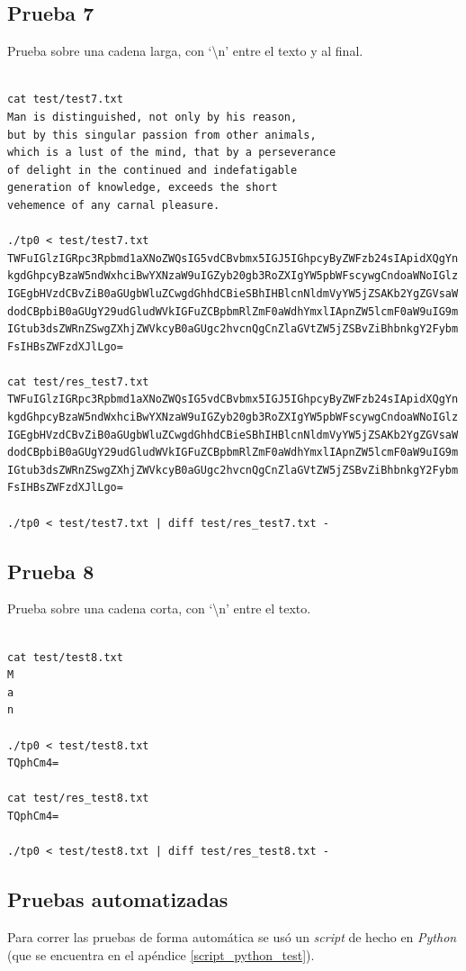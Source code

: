 \documentclass[titlepage,a4paper]{article}
\begin{document}
\subsection{Prueba 7}
Prueba sobre una cadena larga, con `\textbackslash n' entre el texto y al final.
\begin{lstlisting}[style=test_run_style]

cat test/test7.txt
Man is distinguished, not only by his reason, 
but by this singular passion from other animals, 
which is a lust of the mind, that by a perseverance 
of delight in the continued and indefatigable 
generation of knowledge, exceeds the short 
vehemence of any carnal pleasure.

./tp0 < test/test7.txt
TWFuIGlzIGRpc3Rpbmd1aXNoZWQsIG5vdCBvbmx5IGJ5IGhpcyByZWFzb24sIApidXQgYn 
kgdGhpcyBzaW5ndWxhciBwYXNzaW9uIGZyb20gb3RoZXIgYW5pbWFscywgCndoaWNoIGlz 
IGEgbHVzdCBvZiB0aGUgbWluZCwgdGhhdCBieSBhIHBlcnNldmVyYW5jZSAKb2YgZGVsaW 
dodCBpbiB0aGUgY29udGludWVkIGFuZCBpbmRlZmF0aWdhYmxlIApnZW5lcmF0aW9uIG9m 
IGtub3dsZWRnZSwgZXhjZWVkcyB0aGUgc2hvcnQgCnZlaGVtZW5jZSBvZiBhbnkgY2Fybm 
FsIHBsZWFzdXJlLgo=

cat test/res_test7.txt
TWFuIGlzIGRpc3Rpbmd1aXNoZWQsIG5vdCBvbmx5IGJ5IGhpcyByZWFzb24sIApidXQgYn 
kgdGhpcyBzaW5ndWxhciBwYXNzaW9uIGZyb20gb3RoZXIgYW5pbWFscywgCndoaWNoIGlz 
IGEgbHVzdCBvZiB0aGUgbWluZCwgdGhhdCBieSBhIHBlcnNldmVyYW5jZSAKb2YgZGVsaW 
dodCBpbiB0aGUgY29udGludWVkIGFuZCBpbmRlZmF0aWdhYmxlIApnZW5lcmF0aW9uIG9m 
IGtub3dsZWRnZSwgZXhjZWVkcyB0aGUgc2hvcnQgCnZlaGVtZW5jZSBvZiBhbnkgY2Fybm 
FsIHBsZWFzdXJlLgo=

./tp0 < test/test7.txt | diff test/res_test7.txt -

\end{lstlisting}

\subsection{Prueba 8}
Prueba sobre una cadena corta, con `\textbackslash n' entre el texto.
\begin{lstlisting}[style=test_run_style]

cat test/test8.txt
M
a
n

./tp0 < test/test8.txt
TQphCm4=

cat test/res_test8.txt
TQphCm4=

./tp0 < test/test8.txt | diff test/res_test8.txt -

\end{lstlisting}

\subsection{Pruebas automatizadas}
Para correr las pruebas de forma automática se usó un \textit{script} de hecho en \textit{Python} (que se encuentra en el apéndice \ref{script_python_test}).
\end{document}
